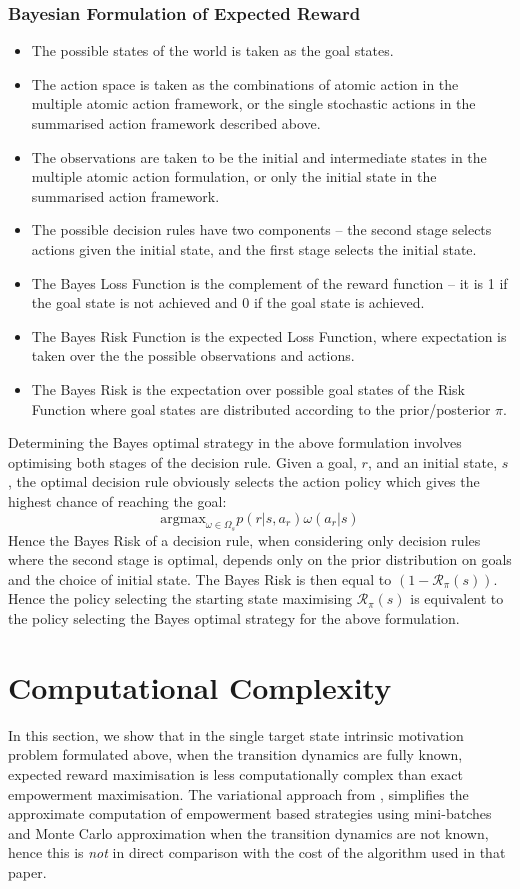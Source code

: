\documentclass{article}
\begin{document}
\subsubsection{Bayesian Formulation of Expected Reward}
\begin{itemize}
\item The possible states of the world is taken as the goal states.
\item The action space is taken as the combinations of atomic action in the multiple atomic action framework, or the single stochastic actions in the summarised action framework described above.
\item The observations are taken to be the initial and intermediate states in the multiple atomic action formulation, or only the initial state in the summarised action framework.
\item The possible decision rules have two components -- the second stage selects actions given the initial state, and the first stage selects the initial state. 
\item The Bayes Loss Function is the complement of the reward function -- it is 1 if the goal state is not achieved and 0 if the goal state is achieved.
\item The Bayes Risk Function is the expected Loss Function, where expectation is taken over the the possible observations and actions. 
\item The Bayes Risk is the expectation over possible goal states of the Risk Function where goal states are distributed according to the prior/posterior $\pi$. 
\end{itemize}
Determining the Bayes optimal strategy in the above formulation involves optimising both stages of the decision rule. Given a goal, $r$, and an initial state, $s$, the optimal decision rule obviously selects the action policy which gives the highest chance of reaching the goal: 
\[\text{argmax}_{\omega\in\Omega_s} p(r|s,a_r)\omega(a_r|s)\]
Hence the Bayes Risk of a decision rule, when considering only decision rules where the second stage is optimal, depends only on the prior distribution on goals and the choice of initial state. The Bayes Risk is then equal to $(1-\mathcal{R}_\pi(s))$. Hence the policy selecting the starting state maximising $\mathcal{R}_\pi(s)$ is equivalent to the policy selecting the Bayes optimal strategy for the above formulation.

\section{Computational Complexity}
In this section, we show that in the single target state intrinsic motivation problem formulated above, when the transition dynamics are fully known, expected reward maximisation is less computationally complex than exact empowerment maximisation. 
The variational approach from \cite{mohamed2015variational}, simplifies the approximate computation of empowerment based strategies using mini-batches and Monte Carlo approximation when the transition dynamics are not known, hence this is \textit{not} in direct comparison with the cost of the algorithm used in that paper. 
\end{document}
